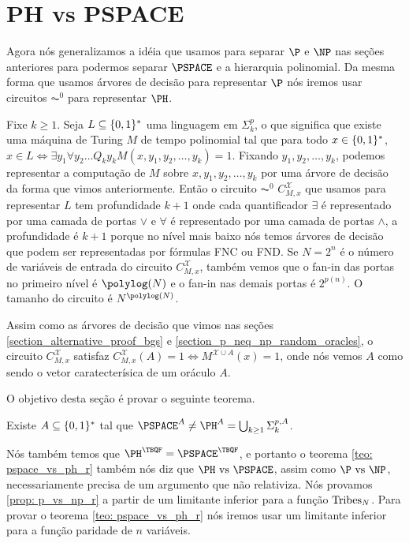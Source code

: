 \section{PH vs PSPACE}

Agora nós generalizamos a idéia que usamos para separar $\P$ e $\NP$ nas seções anteriores para podermos separar $\PSPACE$ e a hierarquia polinomial. Da mesma forma que usamos árvores de decisão para representar $\P$ nós iremos usar circuitos $\AC^{0}$ para representar $\PH$.

Fixe $k \geq 1$. Seja $L \subseteq \{0, 1\}^{*}$ uma linguagem em $\Sigma_{k}^{p}$, o que significa que existe uma máquina de Turing $M$ de tempo polinomial tal que para todo $x \in \{0, 1\}^{*}$, $x \in L \iff \exists y_{1} \forall y_{2} \dots Q_{k} y_{k} M(x, y_{1}, y_{2}, \dots, y_{k}) = 1$. Fixando ${y}_{1}, y_{2}, \dots, y_{k}$, podemos representar a computação de $M$ sobre $x, {y}_{1}, y_{2}, \dots, y_{k}$ por uma árvore de decisão da forma que vimos anteriormente. Então o circuito $\AC^{0}$ $C_{M, x}^{\mathcal{X}}$ que usamos para representar $L$ tem profundidade $k + 1$ onde cada quantificador $\exists$ é representado por uma camada de portas $\lor$ e $\forall$ é representado por uma camada de portas $\land$, a profundidade é $k + 1$ porque no nível mais baixo nós temos árvores de decisão que podem ser representadas por fórmulas FNC ou FND. Se $N = 2^{n}$ é o número de variáveis de entrada do circuito $C_{M, x}^{\mathcal{X}}$, também vemos que o fan-in das portas no primeiro nível é $\polylog(N)$ e o fan-in nas demais portas é $2^{p(n)}$. O tamanho do circuito é $N^{\polylog(N)}$.

Assim como as árvores de decisão que vimos nas seções \ref{section_alternative_proof_bgs} e \ref{section_p_neq_np_random_oracles}, o circuito $C_{M, x}^{\mathcal{X}}$ satisfaz $C_{M, x}^{\mathcal{X}}(A) = 1 \iff M^{\mathcal{X} \cup A}(x) = 1$, onde nós vemos $A$ como sendo o vetor caratecterísica de um oráculo $A$.

O objetivo desta seção é provar o seguinte teorema.

\begin{teo} \label{teo: pspace_vs_ph_r}

Existe $A \subseteq \{0, 1\}^{*}$ tal que $\PSPACE^{A} \neq \PH^{A} = \bigcup_{k \geq 1} \Sigma_{k}^{p, A}$.

\end{teo}

Nós também temos que $\PH^{\TBQF} = \PSPACE^{\TBQF}$, e portanto o teorema \ref{teo: pspace_vs_ph_r} também nós diz que $\PH \text{ vs } \PSPACE$, assim como $\P \text{ vs } \NP$, necessariamente precisa de um argumento que não relativiza. Nós provamos \ref{prop: p_vs_np_r} a partir de um limitante inferior para a função $\text{Tribes}_{N}$. Para provar o teorema \ref{teo: pspace_vs_ph_r} nós iremos usar um limitante inferior para a função paridade de $n$ variáveis.

